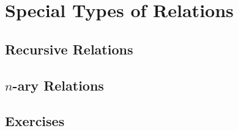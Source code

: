 \section{Special Types of Relations}
\subsection{Recursive Relations}
\subsection{\(n\)-ary Relations}

\subsection{Exercises}




